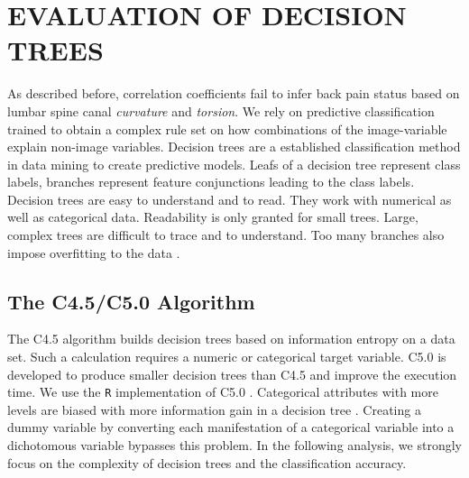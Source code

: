 \documentclass[a4paper,twoside]{style/article}
\begin{document}
\section{\uppercase{Evaluation of Decision Trees}}
\label{sec:DecisionTrees}
\noindent As described before, correlation coefficients fail to infer back pain status based on lumbar spine canal \emph{curvature} and \emph{torsion}.
We rely on predictive classification trained to obtain a complex rule set on how combinations of the image-variable explain non-image variables.
Decision trees are a established classification method in data mining to create predictive models.
Leafs of a decision tree represent class labels, branches represent feature conjunctions leading to the class labels.
Decision trees are easy to understand and to read.
They work with numerical as well as categorical data.
Readability is only granted for small trees.
Large, complex trees are difficult to trace and to understand.
Too many branches also impose overfitting to the data \cite{DecisionTree}.

\subsection{The C4.5/C5.0 Algorithm}
\label{sec:C5.0}
The C4.5 algorithm builds decision trees based on information entropy on a data set.
Such a calculation requires a numeric or categorical target variable.
C5.0 is developed to produce smaller decision trees than C4.5 and improve the execution time.
We use the \texttt{R} implementation of C5.0 \cite{c5.0classification}.
Categorical attributes with more levels are biased with more information gain in a decision tree \cite{deng2011bias}.
Creating a dummy variable by converting each manifestation of a categorical variable into a dichotomous variable bypasses this problem.
In the following analysis, we strongly focus on the complexity of decision trees and the classification accuracy.
\end{document}
